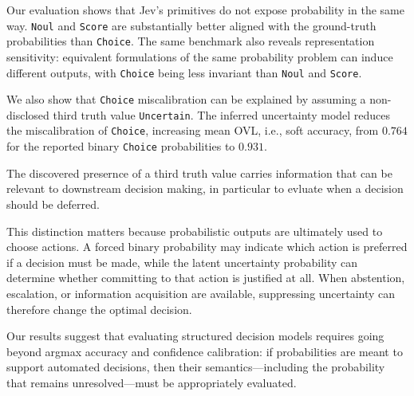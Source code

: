 \documentclass[twoside]{article}
\begin{document}
Our evaluation shows that Jev's primitives do not expose probability in
the same way. \texttt{Noul} and \texttt{Score} are substantially better
aligned with the ground-truth probabilities than \texttt{Choice}. The same benchmark also reveals
representation sensitivity: equivalent formulations of the same
probability problem can induce different outputs, with \texttt{Choice}
being less invariant than \texttt{Noul} and \texttt{Score}.

We also show that \texttt{Choice} miscalibration can be explained by assuming a non-disclosed third truth value \texttt{Uncertain}.
The inferred uncertainty model reduces the miscalibration of \texttt{Choice}, increasing mean OVL, i.e., soft accuracy, from
$0.764$ for the reported binary \texttt{Choice} probabilities to
$0.931$.

The discovered presernce of a third truth value carries information that can be relevant to
downstream decision making, in particular to evluate when a decision should be deferred.

This distinction matters because probabilistic outputs are ultimately
used to choose actions. A forced binary probability may indicate which
action is preferred if a decision must be made, while the latent
uncertainty probability can determine whether committing to that action
is justified at all. When abstention, escalation, or information
acquisition are available, suppressing uncertainty can therefore change
the optimal decision.

Our results suggest that evaluating structured decision models requires going beyond
argmax accuracy and confidence calibration: if probabilities are meant to
support automated decisions, then their semantics---including the
probability that remains unresolved---must be appropriately evaluated.







\end{document}

